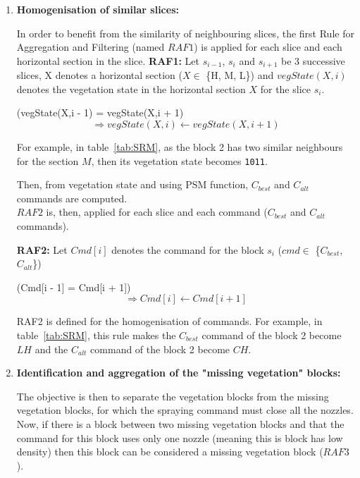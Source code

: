\documentclass[preprint,3p,times,twocolumn]{elsarticle}
\begin{document}
\begin{enumerate}

\item \textbf{Homogenisation of similar slices:}

In order to benefit from the similarity of neighbouring slices, the first Rule for Aggregation and Filtering (named $RAF1$) is applied for each slice and each horizontal section in the slice.
\textbf{RAF1:}
Let $ s_{i-1} $, $ s_{i}$ and $ s_{i+1}$ be 3 successive slices, X denotes a horizontal section ($X \in$ \{H, M, L\}) 
and $vegState(X,i)$ denotes the vegetation state in the horizontal section $X$ for the slice $s_{i}$. \\

\begin{mdframed}
	(vegState(X,i - 1) = vegState(X,i + 1) 
	\[ 
	\Rightarrow  vegState(X,i) \leftarrow vegState(X,i + 1)
	\] 
\end{mdframed}


For example, in table~\ref{tab:SRM}, as the block 2 has two similar neighbours for the section $M$, then its vegetation state becomes \texttt{1011}.

Then, from vegetation state and using PSM function, $C_{best}$ and $C_{alt}$ commands are computed. \\
$RAF2$ is, then, applied for each slice and each command ($C_{best}$ and $C_{alt}$ commands). 


\textbf{RAF2:} Let $Cmd [i]$ denotes the command for the block $s_i$ ($cmd \in$ \{$C_{best}$, $C_{alt}$\}) \\
\begin{mdframed}
	(Cmd[i - 1] = Cmd[i + 1])
	\[  \Rightarrow  Cmd[i] \leftarrow Cmd[i + 1]\] 
\end{mdframed}

RAF2 is defined for the homogenisation of commands. For example, in table~\ref{tab:SRM}, this rule makes the $C_{best}$ command of the block 2 become $LH$ and the $C_{alt}$ command of the block 2 become $CH$.
\item \textbf{Identification and aggregation of the "missing vegetation" blocks:} 

The objective is then to separate the vegetation blocks from the missing vegetation blocks, for which the spraying command must close all the nozzles. Now, if there is a block between two missing vegetation blocks and that the command for this block uses only one nozzle (meaning this is block has low density) then this block can be considered a missing vegetation block ($RAF3$).


\end{enumerate}
\end{document}
